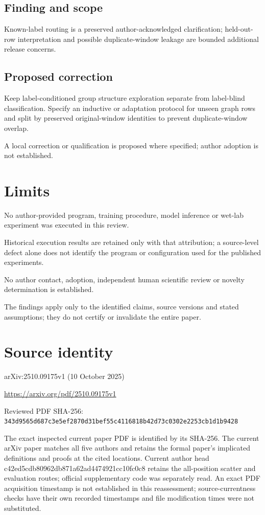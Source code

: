 \documentclass[11pt]{article}
\begin{document}
\subsection*{Finding and scope}

Known-label routing is a preserved author-acknowledged clarification; held-out-row interpretation and possible duplicate-window leakage are bounded additional release concerns.

\subsection*{Proposed correction}

Keep label-conditioned group structure exploration separate from label-blind classification. Specify an inductive or adaptation protocol for unseen graph rows and split by preserved original-window identities to prevent duplicate-window overlap.

A local correction or qualification is proposed where specified; author adoption is not established.

\section*{Limits}

No author-provided program, training procedure, model inference or wet-lab experiment was executed in this review.\par

Historical execution results are retained only with that attribution; a source-level defect alone does not identify the program or configuration used for the published experiments.\par

No author contact, adoption, independent human scientific review or novelty determination is established.\par

The findings apply only to the identified claims, source versions and stated assumptions; they do not certify or invalidate the entire paper.\par

\section*{Source identity}

arXiv:2510.09175v1 (10 October 2025)

\url{https://arxiv.org/pdf/2510.09175v1}

Reviewed PDF SHA-256: \nolinkurl{343d9565d687c3e5ef2870d31bef55c4116818b42d73c0302e2253cb1d1b9428}

The exact inspected current paper PDF is identified by its SHA-256. The current arXiv paper matches all five authors and retains the formal paper’s implicated definitions and proofs at the cited locations. Current author head c42ed5cdb80962db871a62ad4474921cc10fc0c8 retains the all-position scatter and evaluation routes; official supplementary code was separately read. An exact PDF acquisition timestamp is not established in this reassessment; source-currentness checks have their own recorded timestamps and file modification times were not substituted.
\end{document}
